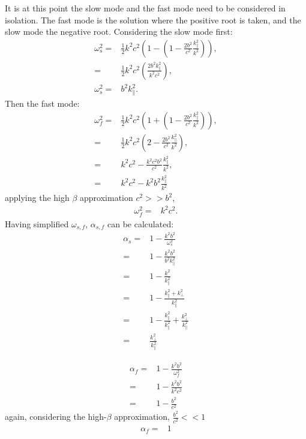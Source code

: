 It is at this point the slow mode and the fast mode need to be considered in isolation.
The fast mode is the solution where the positive root is taken, and the slow mode the negative root.
Considering the slow mode first:
\begin{align}
    \omega^2_{s} =& \frac{1}{2}k^2c^2\left(1 - \left(1 - \frac{2b^2}{c^2} \frac{k^2_\parallel}{k^2}\right)\right),\\
    =& \frac{1}{2}k^2c^2\left(\frac{2b^2k^2_\parallel}{k^2c^2}\right),\\
    \omega^2_{s} =& b^2k^2_\parallel.
\end{align}
Then the fast mode:
\begin{align}
    \omega^2_{f} =& \frac{1}{2}k^2c^2\left(1 + \left(1 - \frac{2b^2}{c^2} \frac{k^2_\parallel}{k^2}\right)\right),\\
                 =& \frac{1}{2}k^2c^2\left(2 - \frac{2b^2}{c^2} \frac{k^2_\parallel}{k^2}\right),\\
                 =& k^2c^2 - \frac{k^2c^2b^2}{c^2}\frac{k^2_\parallel}{k^2},\\
                 =& k^2c^2 - k^2b^2\frac{k^2_\parallel}{k^2}
\end{align}
applying the high $\beta$ approximation $c^2 >> b^2$,
\begin{align}
   \omega^2_{f} =& k^2c^2.
\end{align}
Having simplified $\omega_{s,f}$, $\alpha_{s,f}$ can be calculated:
\begin{align}
    \alpha_s =& 1 - \frac{k^2b^2}{\omega^2_s}\\
             =& 1 - \frac{k^2b^2}{b^2k_\parallel^2}\\
             =& 1 - \frac{k^2}{k_\parallel^2}\\
             =& 1 - \frac{k^2_\parallel + k^2_\perp}{k^2_\parallel}\\
             =& 1 - \frac{k_\parallel^2}{k_\parallel^2} + \frac{k^2_\perp}{k^2_\parallel}\\
             =& \frac{k^2_\perp}{k^2_\parallel}
\end{align}

\begin{align}
    \alpha_f =& 1 - \frac{k^2b^2}{\omega^2_f}\\
    =& 1 - \frac{k^2b^2}{k^2c^2}\\
    =& 1 - \frac{b^2}{c^2}
\end{align}
again, considering the high-$\beta$ approximation, $\displaystyle\frac{b^2}{c^2} << 1$
\begin{align}
    \alpha_f =& 1
\end{align}

